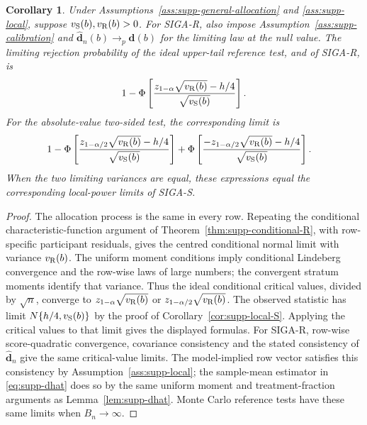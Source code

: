 \documentclass[12pt,a4paper]{article}
\newtheorem{corollary}{Corollary}
\theoremstyle{definition}
\theoremstyle{remark}\newtheorem{remark}{Remark}
\numberwithin{equation}{section}
\begin{document}
\begin{corollary}\label{cor:supp-local-R}
Under Assumptions~\ref{ass:supp-general-allocation} and \ref{ass:supp-local}, suppose $v_{\rm S}(b),v_{\rm R}(b)>0$. For SIGA-R, also impose Assumption~\ref{ass:supp-calibration} and $\widehat{\bm d}_n(b)\to_p\bm d(b)$ for the limiting law at the null value. The limiting rejection probability of the ideal upper-tail reference test, and of SIGA-R, is
\begin{equation}\label{eq:supp-local-R}
1-\Phi\left[
\frac{z_{1-\alpha}\sqrt{v_{\rm R}(b)}-h/4}
{\sqrt{v_{\rm S}(b)}}
\right].
\end{equation}
For the absolute-value two-sided test, the corresponding limit is
\begin{align}
&1-\Phi\left[
\frac{z_{1-\alpha/2}\sqrt{v_{\rm R}(b)}-h/4}
{\sqrt{v_{\rm S}(b)}}
\right]
+\Phi\left[
\frac{-z_{1-\alpha/2}\sqrt{v_{\rm R}(b)}-h/4}
{\sqrt{v_{\rm S}(b)}}
\right].
\label{eq:supp-local-R-two-sided}
\end{align}
When the two limiting variances are equal, these expressions equal the corresponding local-power limits of SIGA-S.
\end{corollary}
\begin{proof}
The allocation process is the same in every row. Repeating the conditional characteristic-function argument of Theorem~\ref{thm:supp-conditional-R}, with row-specific participant residuals, gives the centred conditional normal limit with variance $v_{\rm R}(b)$. The uniform moment conditions imply conditional Lindeberg convergence and the row-wise laws of large numbers; the convergent stratum moments identify that variance. Thus the ideal conditional critical values, divided by $\sqrt n$, converge to $z_{1-\alpha}\sqrt{v_{\rm R}(b)}$ or $z_{1-\alpha/2}\sqrt{v_{\rm R}(b)}$. The observed statistic has limit $N\{h/4,v_{\rm S}(b)\}$ by the proof of Corollary~\ref{cor:supp-local-S}. Applying the critical values to that limit gives the displayed formulas. For SIGA-R, row-wise score-quadratic convergence, covariance consistency and the stated consistency of $\widehat{\bm d}_n$ give the same critical-value limits. The model-implied row vector satisfies this consistency by Assumption~\ref{ass:supp-local}; the sample-mean estimator in \eqref{eq:supp-dhat} does so by the same uniform moment and treatment-fraction arguments as Lemma~\ref{lem:supp-dhat}. Monte Carlo reference tests have these same limits when $B_n\to\infty$.
\end{proof}
\end{document}

